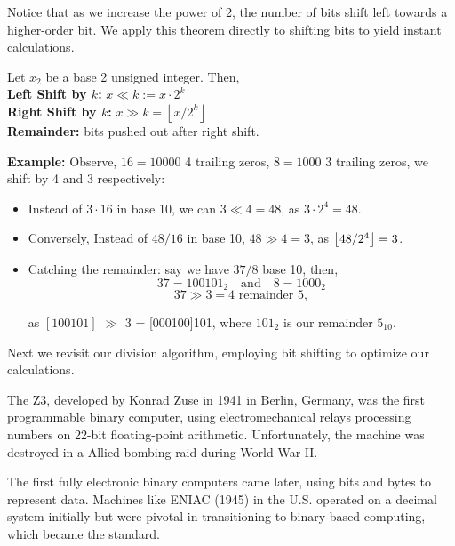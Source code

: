 \noindent
Notice that as we increase the power of 2, the number of bits shift left towards a higher-order bit. We apply this theorem directly to 
shifting bits to yield instant calculations.

\newpage

\begin{theo}

    Let $x_2$ be a base 2 unsigned integer. Then,\\
    \noindent
    \textbf{Left Shift by $k$:} $x \ll k:= x \cdot 2^k$\\
    \noindent
    \textbf{Right Shift by $k$:} $x \gg k = \left\lfloor x/2^k \right\rfloor$\\
    \textbf{Remainder:} bits pushed out after right shift.
\end{theo}
\noindent
\textbf{Example:} Observe, $16=10000$ 4 trailing zeros, $8=1000$ 3 trailing zeros, we shift by 4 and 3 respectively:
\begin{itemize}
    \item Instead of $3 \cdot 16$ in base 10, we can $3 \ll 4=48$, as $3 \cdot 2^4 = 48$.
    \item Conversely, Instead of $48/16$ in base 10, $48 \gg 4 = 3$, as $\floor*{48/2^4} = 3$.
    \item Catching the remainder: say we have $37/8$ base 10, then,
        \[ 37 = 100101_2 \quad \text{and} \quad 8 = 1000_2 \]
        \[ 37 \gg 3 = 4 \text{ remainder } 5, \]

    \noindent    
    as  $[100101]$ $\gg$ 3 = [000100]101, where $101_2$ is our remainder $5_{10}$.
\end{itemize}

\noindent
Next we revisit our division algorithm, employing bit shifting to optimize our calculations.

\begin{Tip}
    The Z3, developed by Konrad Zuse in 1941 in Berlin, Germany, was the first programmable binary computer, using electromechanical relays processing numbers on 22-bit floating-point arithmetic. Unfortunately, the machine was destroyed in a Allied bombing raid during World War II.
    
    The first fully electronic binary computers came later, using bits and bytes to represent data. Machines like ENIAC (1945) in the U.S. operated on a decimal system initially but were pivotal in transitioning to binary-based computing, which became the standard.
    
    \end{Tip}

